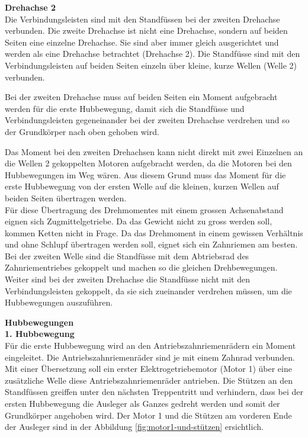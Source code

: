 \textbf{Drehachse 2}\\
Die Verbindungsleisten sind mit den Standfüssen bei der zweiten Drehachse verbunden. Die zweite Drehachse ist nicht eine Drehachse, sondern auf beiden Seiten eine einzelne Drehachse. Sie sind aber immer gleich ausgerichtet und werden als eine Drehachse betrachtet (Drehachse 2). Die Standfüsse sind mit den Verbindungsleisten auf beiden Seiten einzeln über kleine, kurze Wellen (Welle 2) verbunden. 

Bei der zweiten Drehachse muss auf beiden Seiten ein Moment aufgebracht werden für die erste Hubbewegung, damit sich die Standfüsse und Verbindungsleisten gegeneinander bei der zweiten Drehachse verdrehen und so der Grundkörper nach oben gehoben wird.

Das Moment bei den zweiten Drehachsen kann nicht direkt mit zwei Einzelnen an die Wellen 2 gekoppelten Motoren aufgebracht werden, da die Motoren bei den Hubbewegungen im Weg wären. Aus diesem Grund muss das Moment für die erste Hubbewegung von der ersten Welle auf die kleinen, kurzen Wellen auf beiden Seiten übertragen werden.\\

Für diese Übertragung des Drehmomentes mit einem grossen Achsenabstand eignen sich Zugmittelgetriebe. Da das Gewicht nicht zu gross werden soll, kommen Ketten nicht in Frage. Da das Drehmoment in einem gewissen Verhältnis und ohne Schlupf übertragen werden soll, eignet sich ein Zahnriemen am besten. Bei der zweiten Welle sind die Standfüsse mit dem Abtriebsrad des Zahnriementriebes gekoppelt und machen so die gleichen Drehbewegungen. Weiter sind bei der zweiten Drehachse die Standfüsse nicht mit den Verbindungsleisten gekoppelt, da sie sich zueinander verdrehen müssen, um die Hubbewegungen auszuführen.

\newpage

\textbf{Hubbewegungen}\\

\textbf{1. Hubbewegung}\\
Für die erste Hubbewegung wird an den Antriebszahnriemenrädern ein Moment eingeleitet. Die Antriebszahnriemenräder sind je mit einem Zahnrad verbunden. Mit einer Übersetzung soll ein erster Elektrogetriebemotor (Motor 1) über eine zusätzliche Welle diese Antriebszahnriemenräder antrieben. Die Stützen an den Standfüssen greiffen unter den nächsten Treppentritt und verhindern, dass bei der ersten Hubbewegung die Ausleger als Ganzes gedreht werden und somit der Grundkörper angehoben wird. Der Motor 1 und die Stützen am vorderen Ende der Ausleger sind in der Abbildung \ref{fig:motor1-und-stützen} ersichtlich.

